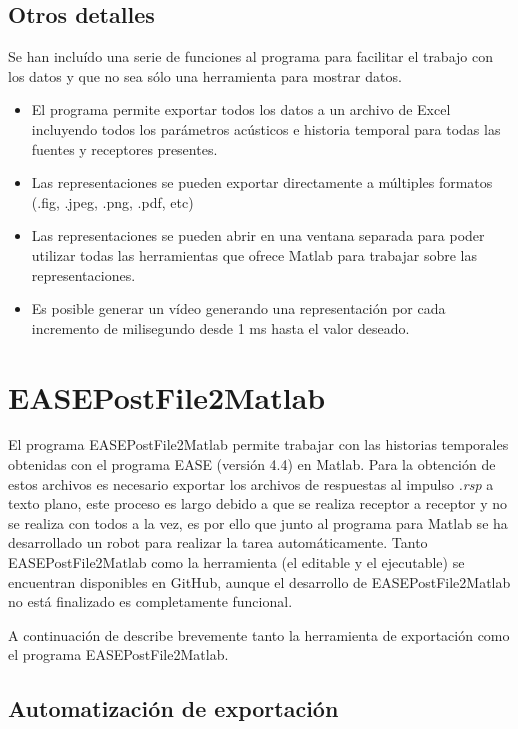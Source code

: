 \begin{description}
\end{description}

\subsection{Otros detalles}

Se han incluído una serie de funciones al programa para facilitar el trabajo con los datos y que no sea sólo una herramienta para mostrar datos. 

\begin{itemize}
  \item El programa permite exportar todos los datos a un archivo de Excel incluyendo todos los parámetros acústicos e historia temporal para todas las fuentes y receptores presentes.
  \item Las representaciones se pueden exportar directamente a múltiples formatos (.fig, .jpeg, .png, .pdf, etc)
  \item Las representaciones se pueden abrir en una ventana separada para poder utilizar todas las herramientas que ofrece Matlab para trabajar sobre las representaciones.
  \item Es posible generar un vídeo generando una representación por cada incremento de milisegundo desde 1 ms hasta el valor deseado.
\end{itemize}


\section{EASEPostFile2Matlab}
\label{easepostfile2matlab}

El programa EASEPostFile2Matlab permite trabajar con las historias temporales obtenidas con el programa EASE (versión 4.4) en Matlab. Para la obtención de estos archivos es necesario exportar los archivos de respuestas al impulso \textit{.rsp} a texto plano, este proceso es largo debido a que se realiza receptor a receptor y no se realiza con todos a la vez, es por ello que junto al programa para Matlab se ha desarrollado un robot para realizar la tarea automáticamente.
Tanto EASEPostFile2Matlab como la herramienta (el editable y el ejecutable) se encuentran disponibles en GitHub, aunque el desarrollo de EASEPostFile2Matlab no está finalizado es completamente funcional.

A continuación de describe brevemente tanto la herramienta de exportación como el programa EASEPostFile2Matlab.


\subsection{Automatización de exportación}


